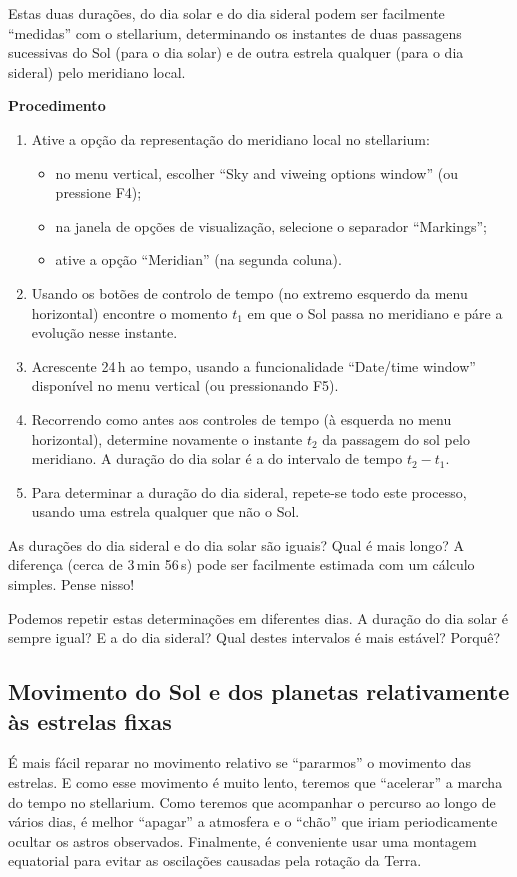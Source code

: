 \documentclass{article}
\begin{document}
\vspace{0.2em}
Estas duas durações, do dia solar e do dia sideral podem ser facilmente
``medidas'' com o stellarium, determinando os instantes de duas passagens
sucessivas do Sol (para o dia solar) e de outra estrela qualquer (para o dia
sideral) pelo meridiano local.

\noindent
\textbf{Procedimento}
\begin{enumerate}
  \item Ative a opção da representação do meridiano local no stellarium:
    \begin{itemize}
      \item
        no menu vertical, escolher ``Sky and viweing options window'' (ou
        pressione F4);
      \item na janela de opções de visualização, selecione o separador
        ``Markings'';
      \item ative a opção ``Meridian'' (na segunda coluna).
    \end{itemize}
  \item
    Usando os botões de controlo de tempo (no extremo esquerdo da menu
    horizontal) encontre o momento $t_1$ em que o Sol passa no meridiano e páre
    a evolução nesse instante.
  \item
    Acrescente 24\,h ao tempo, usando a funcionalidade ``Date/time window''
    disponível no menu vertical (ou pressionando F5).
  \item
    Recorrendo como antes aos controles de tempo (à esquerda no menu
    horizontal), determine novamente o instante $t_2$ da passagem do sol pelo
    meridiano. A duração do dia solar é a do intervalo de tempo $t_2-t_1$.
  \item Para determinar a duração do dia sideral, repete-se todo este processo,
    usando uma estrela qualquer que não o Sol.
\end{enumerate}

As durações do dia sideral e do dia solar são iguais? Qual é mais longo? A
diferença (cerca de 3\,min 56\,s) pode ser facilmente estimada com um cálculo
simples. Pense nisso!

Podemos repetir estas determinações em diferentes dias. A duração do dia solar é
sempre igual? E a do dia sideral? Qual destes intervalos é mais estável? Porquê?

\subsection{Movimento do Sol e dos planetas relativamente às estrelas fixas} 
É mais fácil reparar no movimento relativo se ``pararmos'' o movimento das
estrelas. E como esse movimento é muito lento, teremos que ``acelerar'' a marcha
do tempo no stellarium. Como teremos que acompanhar o percurso ao longo de
vários dias, é melhor ``apagar'' a atmosfera e o ``chão'' que iriam
periodicamente ocultar os astros observados. Finalmente, é conveniente usar uma
montagem equatorial para evitar as oscilações causadas pela rotação da Terra.
\end{document}
